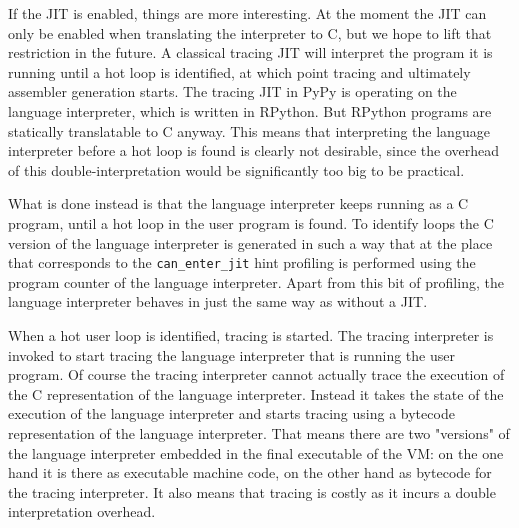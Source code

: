 \documentclass{acm_proc_article-sp}
\begin{document}
If the JIT is enabled, things are more interesting. At the moment the JIT can
only be enabled when translating the interpreter to C, but we hope to lift that
restriction in the future. A classical tracing JIT will
interpret the program it is running until a hot loop is identified, at which
point tracing and ultimately assembler generation starts. The tracing JIT in
PyPy is operating on the language interpreter, which is written in RPython. But
RPython programs are statically translatable to C anyway. This means that interpreting the
language interpreter before a hot loop is found is clearly not desirable,
since the overhead of this double-interpretation would be significantly too big
to be practical.

What is done instead is that the language interpreter keeps running as a C
program, until a hot loop in the user program is found. To identify loops the
C version of the language interpreter is generated in such a way that at the
place that corresponds to the \texttt{can\_enter\_jit} hint profiling is
performed using the program counter of the language interpreter. Apart from this
bit of profiling, the language interpreter behaves in just the same way as
without a JIT.

When a hot user loop is identified, tracing is started. The
tracing interpreter is invoked to start tracing the language interpreter that is
running the user program. Of course the tracing interpreter cannot actually
trace the execution of the C representation of the language interpreter. Instead
it takes the state of the execution of the language interpreter and starts
tracing using a bytecode representation of the language interpreter. That means
there are two "versions" of the language interpreter embedded in the final
executable of the VM: on the one hand it is there as executable machine code, on
the other hand as bytecode for the tracing interpreter. It also means that
tracing is costly as it incurs a double interpretation overhead.
\end{document}
